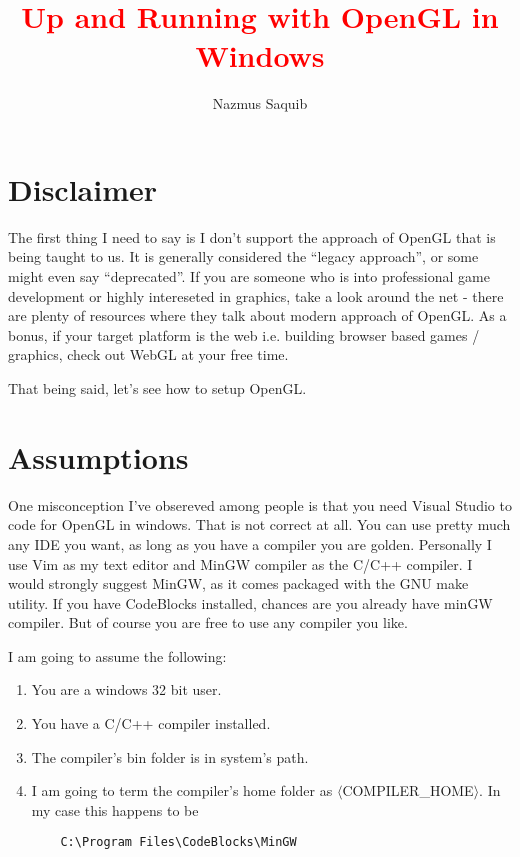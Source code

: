 \documentclass{article}
\begin{document}
\title{\textcolor{red}{Up and Running with OpenGL in Windows}}
\author{Nazmus Saquib}
\maketitle

\section{Disclaimer}
The first thing I need to say is I don't support the approach of OpenGL that is being taught to us.
It is generally considered the ``legacy approach'', or some might even say ``deprecated''.
If you are someone who is into professional game development or highly intereseted in graphics,
take a look around the net - there are plenty of resources where they talk about modern approach of OpenGL.
As a bonus, if your target platform is the web i.e. building browser based games / graphics,
check out WebGL at your free time.

That being said, let's see how to setup OpenGL.

\section{Assumptions}
One misconception I've obsereved among people is that you need Visual Studio to code for OpenGL in windows.
That is not correct at all.
You can use pretty much any IDE you want, as long as you have a compiler you are golden.
Personally I use Vim as my text editor and MinGW compiler as the C/C++ compiler.
I would strongly suggest MinGW, as it comes packaged with the GNU make utility.
If you have CodeBlocks installed, chances are you already have minGW compiler.
But of course you are free to use any compiler you like.

I am going to assume the following:
\begin{enumerate}
\item You are a windows 32 bit user.
\item You have a C/C++ compiler installed.
\item The compiler's bin folder is in system's path.
\item I am going to term the compiler's home folder as $\langle$COMPILER\_HOME$\rangle$.
In my case this happens to be 
\begin{verbatim}
	C:\Program Files\CodeBlocks\MinGW
\end{verbatim}
\end{enumerate}
\end{document}
